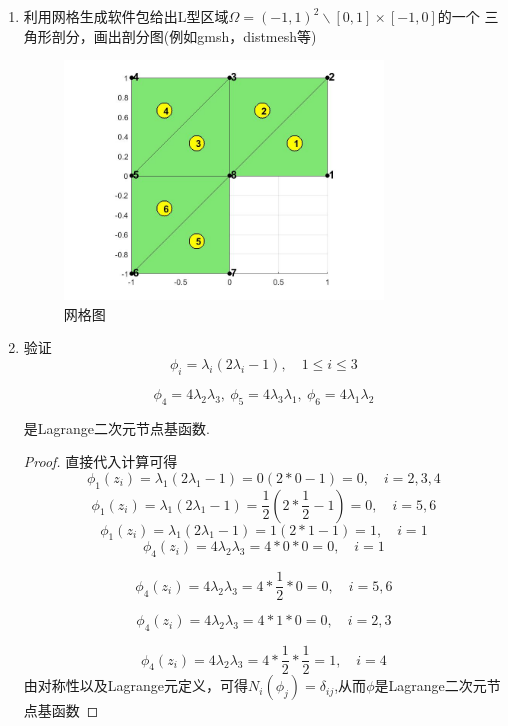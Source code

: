 \documentclass[12pt,a4paper]{article}
\begin{document}
\begin{enumerate}
\begin{proof}[证明]
			由于 $C=B^T$, (a) 等价于 (b).
			
		\end{proof}
		\item 利用网格生成软件包给出L型区域$\Omega=(-1,1)^2\backslash[0,1]\times[-1,0]$的一个
		三角形剖分，画出剖分图(例如gmsh，distmesh等)
		
		\begin{figure}[ht]
			\centering
			\includegraphics[width=0.8\textwidth]{hw3_2.jpg}
			\caption{网格图}
			\label{fig:triangelmesh}
		\end{figure}
		
		\item 验证
		$$
		\phi_i=\lambda_i(2\lambda_i-1),\quad1\leq i\leq3
		$$
		
		$$
		\phi_4=4\lambda_2\lambda_3,\:\phi_5=4\lambda_3\lambda_1,\:\phi_6=4\lambda_1\lambda_2
		$$
		
		是Lagrange二次元节点基函数. 
		
		\begin{proof}
			直接代入计算可得
			$$
			\phi_1(z_i)=\lambda_1(2\lambda_1-1)=0(2*0-1)=0, \quad i = 2,3,4
			$$
			$$
			\phi_1(z_i)=\lambda_1(2\lambda_1-1)=\frac{1}{2}(2*\frac{1}{2}-1)=0, \quad i = 5,6
			$$
			$$
			\phi_1(z_i)=\lambda_1(2\lambda_1-1)=1(2*1-1)=1, \quad i = 1
			$$
			$$
			\phi_4(z_i)=4\lambda_2\lambda_3=4*0*0=0, \quad i = 1
			$$
			
			$$
			\phi_4(z_i)=4\lambda_2\lambda_3=4*\frac{1}{2}*0=0, \quad i = 5,6
			$$
			
			$$
			\phi_4(z_i)=4\lambda_2\lambda_3=4*1*0=0, \quad i = 2,3
			$$
			
			$$
			\phi_4(z_i)=4\lambda_2\lambda_3=4*\frac{1}{2}*\frac{1}{2}=1, \quad i = 4
			$$
			由对称性以及Lagrange元定义，可得$N_i(\phi_j)=\delta_{ij}$,从而$\phi$是Lagrange二次元节点基函数
		\end{proof}
		

\end{enumerate}
\end{document}

